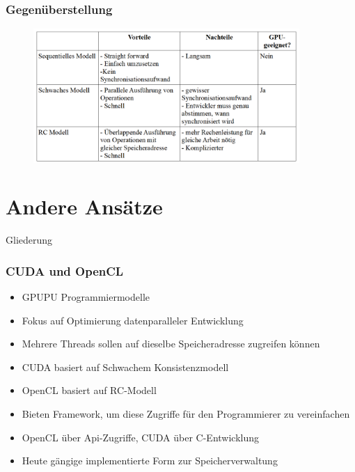 \documentclass{sikslides}
\begin{document}
\begin{frame}
	\frametitle{Gegenüberstellung}
\begin{figure}[htbp] 
  \centering
  \includegraphics[width=0.9\textwidth]{figures/vergleich.png}
  \label{Fig:vg}
\end{figure}

\end{frame}

\section{Andere Ansätze}

\begin{frame}{Gliederung}
   
    	\tableofcontents[currentsection, subsectionstyle=show/show/hide]
\end{frame}


\begin{frame}
	\frametitle{CUDA und OpenCL}
		\begin{itemize}

		\item GPUPU Programmiermodelle \bigskip
		\item Fokus auf Optimierung datenparalleler Entwicklung \bigskip
		\item Mehrere Threads sollen auf dieselbe Speicheradresse zugreifen können \bigskip
		\item CUDA basiert auf Schwachem Konsistenzmodell \bigskip
		\item OpenCL basiert auf RC-Modell \bigskip
		\item Bieten Framework, um diese Zugriffe für den Programmierer zu vereinfachen \bigskip
		\item OpenCL über Api-Zugriffe, CUDA über C-Entwicklung

\bigksip
\item Heute gängige implementierte Form zur Speicherverwaltung

	\end{itemize}
\end{frame}
\end{document}
